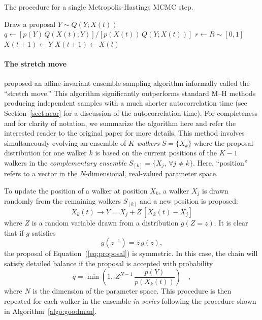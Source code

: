 \documentclass[12pt,preprint]{aastex}
\newcommand{\numberparagraphs}{}
\newcommand{\nonumberparagraphs}{}
\newcommand{\Eq}[1]{Equation~(\ref{eq:#1})}
\newcommand{\eq}[1]{\Eq{#1}}
\newcommand{\eqlabel}[1]{\label{eq:#1}}
\newcommand{\Sect}[1]{Section~\ref{sect:#1}}
\newcommand{\sect}[1]{\Sect{#1}}
\newcommand{\Algo}[1]{Algorithm~\ref{algo:#1}}
\newcommand{\algo}[1]{\Algo{#1}}
\newcommand{\algolabel}[1]{\label{algo:#1}}
\newcommand{\ensemble}{S}
\renewcommand{\vector}[1]{#1}
\newcommand{\pr}[1]{\ensuremath{p(#1)}}
\begin{document}
\nonumberparagraphs
\begin{algorithm}
\caption{The procedure for a single Metropolis-Hastings MCMC step.
    \algolabel{mh}}
\begin{algorithmic}[1]

\STATE Draw a proposal $Y \sim Q (Y; X(t))$
\STATE $q \gets [\pr{\vector{Y}} \, Q(X(t); Y)]
        / [\pr{\vector{X}(t)} \, Q(Y;X(t))]$%
            \hspace{1cm}{\footnotesize\it // This line is generally expensive}
\STATE $r \gets R \sim [0, 1]$
    \STATE $\vector{X}(t+1) \gets \vector{Y}$
\ELSE
    \STATE $\vector{X}(t+1) \gets \vector{X}(t)$
\ENDIF

\end{algorithmic}
\end{algorithm}
\numberparagraphs

\paragraph{The stretch move}

 proposed an affine-invariant ensemble sampling
algorithm informally called the ``stretch move.'' This algorithm
significantly outperforms standard M--H methods producing independent
samples with a much shorter autocorrelation time (see \sect{acor} for
a discussion of the autocorrelation time). For completeness and for
clarity of notation, we summarize the algorithm here and refer the interested
reader to the original paper for more details. This method involves
simultaneously evolving an ensemble of $K$ \emph{walkers}
$\ensemble = \{ \vector{X_k} \}$ where the proposal
distribution for one walker $k$ is based on the current positions of the
$K-1$ walkers in the \emph{complementary ensemble}
$\ensemble_{[k]} = \{ \vector{X_j}, \, \forall j \ne k \}$. Here, ``position''
refers to a vector in the $N$-dimensional, real-valued parameter space.


To update the position of a walker at position $\vector{X_k}$,
a walker $X_j$ is drawn randomly from the remaining walkers $\ensemble_{[k]}$
and a new position is proposed:
\begin{equation}
    \eqlabel{proposal}
    \vector{X_k} (t) \to \vector{Y} = \vector{X_j}
            + Z \, [\vector{X_k} (t) - \vector{X_j}]
\end{equation}
where $Z$ is a random variable drawn from a distribution $g(Z = z)$.
It is clear that if $g$ satisfies
\begin{equation}
    g(z^{-1}) = z \, g(z),
\end{equation}
the proposal of \eq{proposal} is symmetric. In this case, the chain will
satisfy detailed balance if the proposal is accepted with probability
\begin{equation}
    \eqlabel{acceptance}
    q = \min \left( 1,\, Z^{N-1} \,
                \frac{\pr{\vector{Y}}}{\pr{\vector{X_k} (t)}} \right) \quad,
\end{equation}
where $N$ is the dimension of the parameter space. This procedure is then
repeated for each walker in the ensemble \emph{in series} following the
procedure shown in \algo{goodman}.
\end{document}

